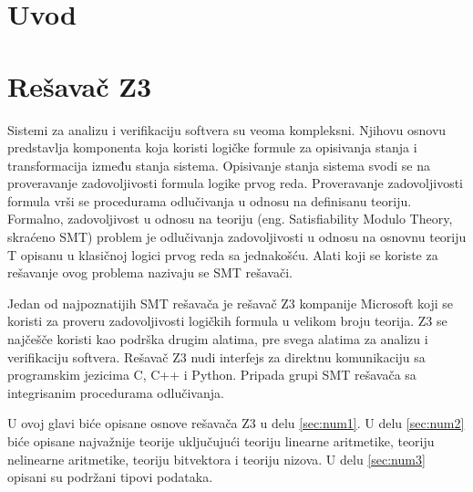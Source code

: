 \documentclass[12pt,oneside]{memoir}
\begin{document}
\frontmatter
\naslovna
\komisija
\apstrakt
\tableofcontents*

\mainmatter

\chapter{Uvod}


\chapter{Rešavač Z3}
\label{chp:razrada}

Sistemi za analizu i verifikaciju softvera su veoma kompleksni. Njihovu osnovu predstavlja komponenta koja koristi logičke formule za opisivanja stanja i transformacija između stanja sistema. Opisivanje stanja sistema svodi se na proveravanje zadovoljivosti formula logike prvog reda. Proveravanje zadovoljivosti formula vrši se procedurama odlučivanja u odnosu na definisanu teoriju. Formalno, zadovoljivost u odnosu na teoriju (eng. Satisfiability Modulo Theory, skraćeno SMT) problem je odlučivanja zadovoljivosti u odnosu na osnovnu teoriju T opisanu u klasičnoj logici prvog reda sa jednakošću. Alati koji se koriste za rešavanje ovog problema nazivaju se SMT rešavači. 
\par

Jedan od najpoznatijih SMT rešavača je rešavač Z3 kompanije Microsoft koji se koristi za proveru zadovoljivosti logičkih formula u velikom broju teorija. Z3 se najčešče koristi kao podrška drugim alatima, pre svega alatima za analizu i verifikaciju softvera. Rešavač Z3 nudi interfejs za direktnu komunikaciju sa programskim jezicima C, C++ i Python. Pripada grupi SMT rešavača sa integrisanim procedurama odlučivanja.
\par
U ovoj glavi biće opisane osnove rešavača Z3 u delu \ref{sec:num1}. U delu \ref{sec:num2} biće opisane najvažnije teorije uključujući teoriju linearne aritmetike, teoriju nelinearne aritmetike, teoriju bitvektora i teoriju nizova. U delu \ref{sec:num3} opisani su podržani tipovi podataka.  
\end{document}

